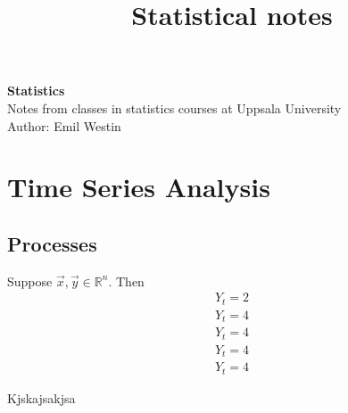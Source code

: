 \documentclass[11pt]{article}
\begin{document}
\title{Statistical notes}

\thispagestyle{empty}

\begin{center}
{\LARGE \bf Statistics}\\
Notes from classes in statistics courses at Uppsala University \\
Author: Emil Westin
\end{center}

\section{Time Series Analysis}

\subsection{Processes}



Suppose $\vec{x},\vec{y} \in \mathbb{R}^n$. Then 
\begin{align}
Y_t = 2 \label{MA1} \\
Y_t = 4 \label{MA2} \\
Y_t = 4 \label{AR1} \\
Y_t = 4 \label{AR2} \\
Y_t = 4 \label{ARMA} 
\end{align}

Kjskajsakjsa
\end{document}
